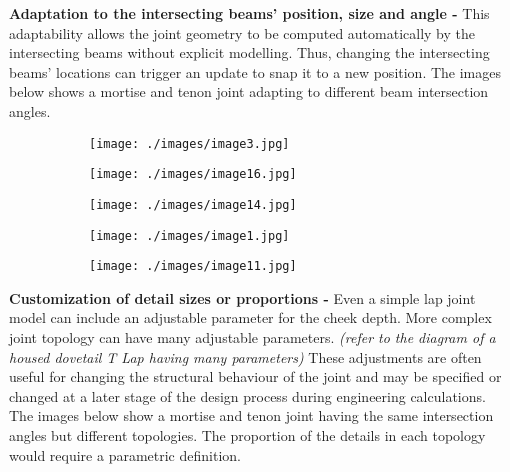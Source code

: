 \textbf{Adaptation to the intersecting beams' position, size and angle -} This adaptability allows the joint geometry to be computed automatically by the intersecting beams without explicit modelling. Thus, changing the intersecting beams’ locations can trigger an update to snap it to a new position. The images below shows a mortise and tenon joint adapting to different beam intersection angles.

\begin{figure}[H]
\centering
\begin{subfigure}[b]{0.18\textwidth}
\centering
\texttt{[image: ./images/image3.jpg]}
\end{subfigure}
\hfill
\begin{subfigure}[b]{0.18\textwidth}
\centering
\texttt{[image: ./images/image16.jpg]}
\end{subfigure}
\hfill
\begin{subfigure}[b]{0.18\textwidth}
\centering
\texttt{[image: ./images/image14.jpg]}
\end{subfigure}
\hfill
\begin{subfigure}[b]{0.18\textwidth}
\centering
\texttt{[image: ./images/image1.jpg]}
\end{subfigure}
\hfill
\begin{subfigure}[b]{0.18\textwidth}
\centering
\texttt{[image: ./images/image11.jpg]}
\end{subfigure}
\end{figure}


\textbf{Customization of detail sizes or proportions - }Even a simple lap joint model can include an adjustable parameter for the cheek depth. More complex joint topology can have many adjustable parameters. \textit{(refer to the diagram of a housed dovetail T Lap having many parameters) }These adjustments are often useful for changing the structural behaviour of the joint and may be specified or changed at a later stage of the design process during engineering calculations. The images below show a mortise and tenon joint having the same intersection angles but different topologies. The proportion of the details in each topology would require a parametric definition.

